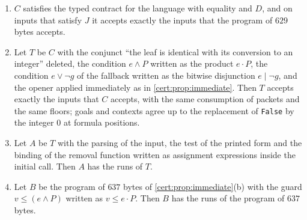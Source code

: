 \begin{proposition}\label{cert:prop:bit-products}
\begin{enumerate}[label=(\alph*)]
\item $C$ satisfies the typed contract for the language with equality and $D$,
and on inputs that satisfy $J$ it accepts exactly the inputs that the program
of $629$ bytes accepts.
\item Let $T$ be $C$ with the conjunct ``the leaf is identical with its
conversion to an integer'' deleted, the condition $e\land P$ written as the
product $e\cdot P$, the condition $e\lor\neg g$ of the fallback written as the
bitwise disjunction $e\mathbin{|}\neg g$, and the opener applied immediately as
in \cref{cert:prop:immediate}. Then $T$ accepts exactly the inputs that $C$
accepts, with the same consumption of packets and the same floors; goals and
contexts agree up to the replacement of \texttt{False} by the integer $0$ at
formula positions.
\item Let $A$ be $T$ with the parsing of the input, the test of the printed
form and the binding of the removal function written as assignment
expressions inside the initial call. Then $A$ has the runs of $T$.
\item Let $B$ be the program of $637$ bytes of \cref{cert:prop:immediate}(b)
with the guard $v\le(e\land P)$ written as $v\le e\cdot P$. Then $B$ has the
runs of the program of $637$ bytes.
\end{enumerate}
\end{proposition}
